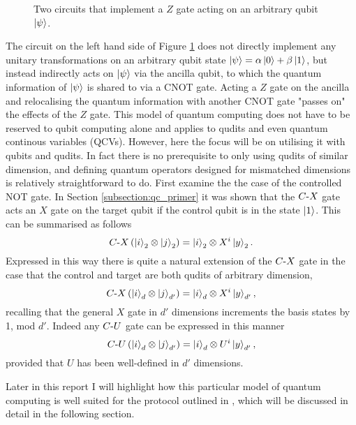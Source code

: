 \begin{figure}[h]
    \begin{center}
    \caption{Two circuits that implement a $Z$ gate acting on an arbitrary qubit $\ket{\psi}$.}
    \label{simple aqc}
    \end{center}
\end{figure}
The circuit on the left hand side of Figure \ref{simple aqc} does not directly implement any unitary transformations on an arbitrary qubit state $\ket{\psi} = \alpha \ket{0} + \beta \ket{1}$, but instead indirectly acts on $\ket{\psi}$ via the ancilla qubit, to which the quantum information of $\ket{\psi}$ is shared to via a CNOT gate. Acting a $Z$ gate on the ancilla and relocalising the quantum information with another CNOT gate "passes on" the effects of the $Z$ gate.
This model of quantum computing does not have to be reserved to qubit computing alone and applies to qudits and even quantum continous variables (QCVs).
However, here the focus will be on utilising it with qubits and qudits.
In fact there is no prerequisite to only using qudits of similar dimension, and defining quantum operators designed for mismatched dimensions is relatively straightforward to do.
First examine the the case of the controlled NOT gate.
In Section \ref{subsection:qc_primer} it was shown that the $C\text{-}X$ gate acts an $X$ gate on the target qubit if the control qubit is in the state $\ket{1}$. This can be summarised as follows
\begin{equation}
    C\text{-}X\left(\ket{i}_2\otimes\ket{j}_2\right) = \ket{i}_2 \otimes X^i\ket{y}_2.
\end{equation}
Expressed in this way there is quite a natural extension of the $C\text{-}X$ gate in the case that the control and target are both qudits of arbitrary dimension,
\begin{equation}
    C\text{-}X\left(\ket{i}_d\otimes\ket{j}_{d'}\right) = \ket{i}_d \otimes X^i\ket{y}_{d'},
\end{equation}
recalling that the general $X$ gate in $d'$ dimensions increments the basis states by 1, mod $d'$.
Indeed any $C\text{-}U$ gate can be expressed in this manner
\begin{equation}
    C\text{-}U\left(\ket{i}_d\otimes\ket{j}_{d'}\right) = \ket{i}_d \otimes U^i\ket{y}_{d'},
\end{equation}
provided that $U$ has been well-defined in $d'$ dimensions.

Later in this report I will highlight how this particular model of quantum computing is well suited for the protocol outlined in \cite{giordani2020}, which will be discussed in detail in the following section.
